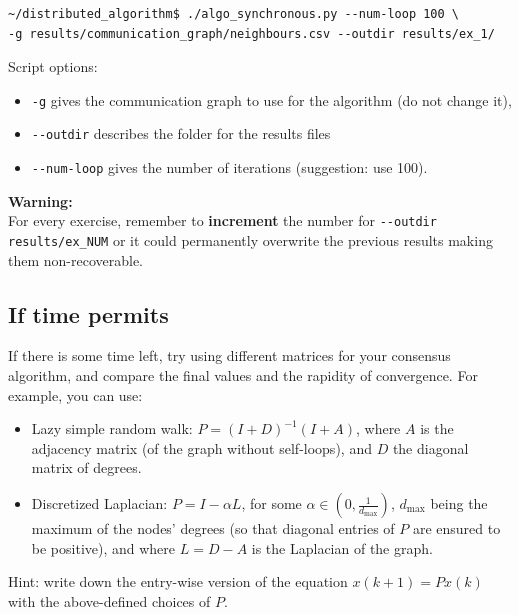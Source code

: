 \documentclass[oneside]{article}
\begin{document}
\begin{verbatim}
~/distributed_algorithm$ ./algo_synchronous.py --num-loop 100 \
-g results/communication_graph/neighbours.csv --outdir results/ex_1/
\end{verbatim}


Script options:
\begin{itemize}
	\item \verb=-g= gives the communication graph to use for the algorithm (do not change it),
	\item \verb=--outdir= describes the folder for the results files
    \item \verb=--num-loop=  gives the number of iterations (suggestion: use 100).
\end{itemize}

\textbf{Warning:} \\
For every exercise, remember to \textbf{increment} the number for \verb=--outdir results/ex_NUM=
or it could permanently overwrite the previous results making them non-recoverable.




\subsection{If time permits}
If there is some time left, try using different matrices for your consensus algorithm, and compare the final values and the rapidity of convergence. For example, you can use:
\begin{itemize}
\item Lazy simple random walk: $P = (I+D)^{-1} (I+A)$, where $A$ is the adjacency matrix (of the graph without self-loops), and $D$ the diagonal matrix of degrees.
\item Discretized Laplacian:  $P = I - \alpha L$, for some $\alpha \in (0,\frac{1}{d_{\max}})$, $d_{\max}$ being the maximum of the nodes' degrees (so that diagonal entries of $P$ are ensured to be positive), and where $L=D-A$ is the Laplacian of the graph.
\end{itemize}
Hint: write down the entry-wise version of the equation $x(k+1) = P x(k)$ with the above-defined choices of $P$.
\end{document}
